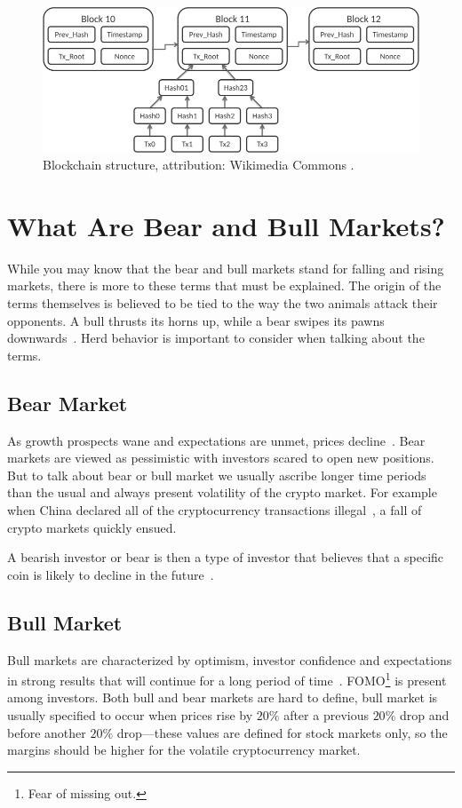 \begin{figure}[!hbt]
    \centering
    \includegraphics[width=\columnwidth]{figures/Bitcoin_Block_Data.png}
    \caption{Blockchain structure, attribution: Wikimedia Commons \cite{wikimedia:blockchain}.}
    \label{blockchain-figure}
\end{figure}

\section{What Are Bear and Bull Markets?}
While you may know that the bear and bull markets stand for falling and rising markets, there is more to these terms that must be explained. The origin of the terms themselves is believed to be tied to the way the two animals attack their opponents. A bull thrusts its horns up, while a bear swipes its pawns downwards~\cite{investopedia-bull-market}.
Herd behavior is important to consider when talking about the terms.

\subsection*{Bear Market}
As growth prospects wane and expectations are unmet, prices decline~\cite{investopedia-bear-market}. Bear markets are viewed as pessimistic with investors scared to open new positions. But to talk about bear or bull market we usually ascribe longer time periods than the usual and always present volatility of the crypto market. For example when China declared all of the cryptocurrency transactions illegal~\cite{china-ban}, a fall of crypto markets quickly ensued.

A bearish investor or bear is then a type of investor that believes that a specific coin is likely to decline in the future~\cite{investopedia-bull}.

\subsection*{Bull Market}
Bull markets are characterized by optimism, investor confidence and expectations in strong results that will continue for a long period of time~\cite{investopedia-bull-market}. FOMO\footnote{Fear of missing out.} is present among investors. Both bull and bear markets are hard to define, bull market is usually specified to occur when prices rise by $20\%$ after a previous $20\%$ drop and before another $20\%$ drop---these values are defined for stock markets only, so the margins should be higher for the volatile cryptocurrency market.

